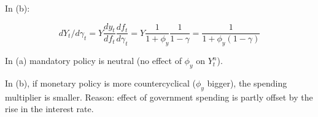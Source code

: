 {\begin{enumerate}[label=(\alph*)]
{In (b):

$$
d Y_{t} / d \gamma_{t}=Y \frac{d y_{t}}{d f_{t}} \frac{d f_{t}}{d \gamma_{t}}=Y \frac{1}{1+\phi_{y}} \frac{1}{1-\gamma}=\frac{1}{1+\phi_{y}(1-\gamma)}
$$
}
{
\item 
In (a) mandatory policy is neutral (no effect of $\phi_{y}$ on $Y_{t}^{n}$).

In (b), if monetary policy is more countercyclical ($\phi_{y}$ bigger), the spending multiplier is smaller. Reason: effect of government spending is partly offset by the rise in the interest rate.
}
\end{enumerate}
}